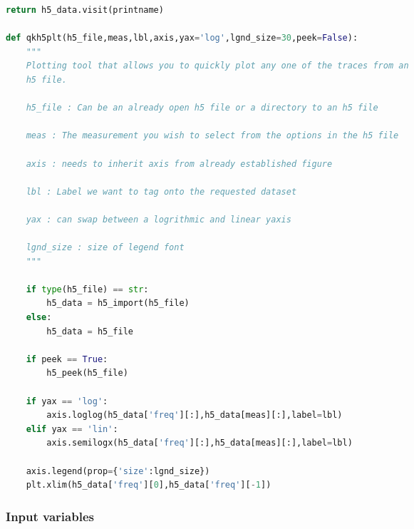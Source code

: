 \begin{spacing}{1}
\begin{lstlisting}[frame=single, language=Python]
    return h5_data.visit(printname)

def qkh5plt(h5_file,meas,lbl,axis,yax='log',lgnd_size=30,peek=False):
    """
    Plotting tool that allows you to quickly plot any one of the traces from an
    h5 file.

    h5_file : Can be an already open h5 file or a directory to an h5 file

    meas : The measurement you wish to select from the options in the h5 file

    axis : needs to inherit axis from already established figure

    lbl : Label we want to tag onto the requested dataset

    yax : can swap between a logrithmic and linear yaxis

    lgnd_size : size of legend font
    """

    if type(h5_file) == str:
        h5_data = h5_import(h5_file)
    else:
        h5_data = h5_file

    if peek == True:
        h5_peek(h5_file)

    if yax == 'log':
        axis.loglog(h5_data['freq'][:],h5_data[meas][:],label=lbl)
    elif yax == 'lin':
        axis.semilogx(h5_data['freq'][:],h5_data[meas][:],label=lbl)

    axis.legend(prop={'size':lgnd_size})
    plt.xlim(h5_data['freq'][0],h5_data['freq'][-1])

\end{lstlisting} \end{spacing}

\subsubsection{Input variables}\label{input-variables}

